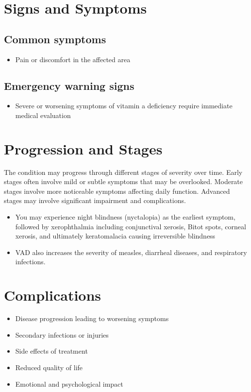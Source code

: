 \section{Signs and Symptoms}
\subsection{Common symptoms}
\begin{itemize}[noitemsep]
  \item Pain or discomfort in the affected area
  \end{itemize}
\subsection{Emergency warning signs}
\begin{itemize}[noitemsep]
  \item Severe or worsening symptoms of vitamin a deficiency require immediate medical evaluation
\end{itemize}
\section{Progression and Stages}
The condition may progress through different stages of severity over time. Early stages often involve mild or subtle symptoms that may be overlooked. Moderate stages involve more noticeable symptoms affecting daily function. Advanced stages may involve significant impairment and complications.

\begin{itemize}[noitemsep]
  \item You may experience night blindness (nyctalopia) as the earliest symptom, followed by xerophthalmia including conjunctival xerosis, Bitot spots, corneal xerosis, and ultimately keratomalacia causing irreversible blindness
  \item VAD also increases the severity of measles, diarrheal diseases, and respiratory infections.
\end{itemize}
\section{Complications}
\begin{itemize}[noitemsep]
  \item Disease progression leading to worsening symptoms
  \item Secondary infections or injuries
  \item Side effects of treatment
  \item Reduced quality of life
  \item Emotional and psychological impact
\end{itemize}
